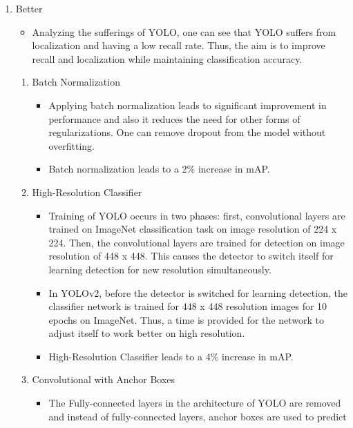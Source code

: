 \documentclass{article}
\begin{document}
\begin{enumerate}
    \item Better
    \begin{itemize}
        \item Analyzing the sufferings of YOLO, one can see that YOLO suffers from 
        localization and having a low recall rate. Thus, the aim is to improve 
        recall and localization while maintaining classification accuracy.
    \end{itemize}
    \begin{enumerate}
        \item Batch Normalization
        \begin{itemize}
            \item Applying batch normalization leads to significant improvement in 
            performance and also it reduces the need for other forms of 
            regularizations. One can remove dropout from the model without 
            overfitting.
            \item Batch normalization leads to a 2\% increase in mAP.
        \end{itemize}
        \item High-Resolution Classifier
        \begin{itemize}
            \item Training of YOLO occurs in two phases: first, convolutional 
            layers are trained on ImageNet classification task on image resolution 
            of 224 x 224. Then, the convolutional layers are trained for detection 
            on image resolution of 448 x 448. This causes the detector to switch itself 
            for learning detection for new resolution simultaneously.
            \item In YOLOv2, before the detector is switched for learning detection, 
            the classifier network is trained for 448 x 448 resolution images for 10 
            epochs on ImageNet. Thus, a time is provided for the network to adjust 
            itself to work better on high resolution.
            \item High-Resolution Classifier leads to a 4\% increase in mAP.
        \end{itemize}
        \item Convolutional with Anchor Boxes
        \begin{itemize}
            \item The Fully-connected layers in the architecture of YOLO are removed 
        and instead of fully-connected layers, anchor boxes are used to predict 

\end{itemize}
\end{enumerate}
\end{enumerate}
\end{document}
